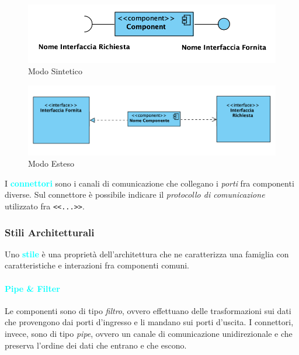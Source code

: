 \begin{figure}[H]
    \centering
    \includegraphics[scale=0.8]{img/lollipop.png}
    \caption{Modo Sintetico}
\end{figure}

\begin{figure}[H]
    \centering
    \includegraphics[scale=0.5]{img/interfacce.png}
    \caption{Modo Esteso}
\end{figure}

\begin{definition}[Connettori]
    I \textbf{\textcolor{cyan}{connettori}} sono i canali di comunicazione che collegano i \emph{porti} fra componenti
    diverse. Sul connettore è possibile indicare il \emph{protocollo di comunicazione} utilizzato fra \verb|<<...>>|.
\end{definition}

\subsubsection{Stili Architetturali}
\begin{definition}[Stile]
    Uno \textbf{\textcolor{cyan}{stile}} è una proprietà dell'architettura che ne caratterizza una famiglia con caratteristiche
    e interazioni fra componenti comuni.
\end{definition}

\paragraph{\textcolor{cyan}{Pipe \& Filter}}
Le componenti sono di tipo \emph{filtro}, ovvero effettuano delle trasformazioni sui dati
che provengono dai porti d'ingresso e li mandano sui porti d'uscita. I connettori, invece, sono di tipo
\emph{pipe}, ovvero un canale di comunicazione unidirezionale e che preserva l'ordine dei dati che entrano e che escono.

